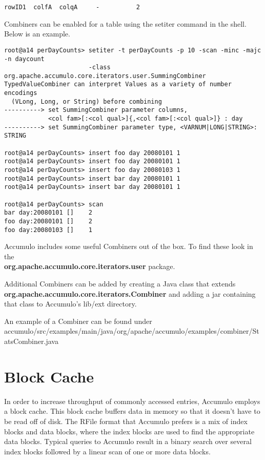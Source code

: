 \small
\begin{verbatim}
rowID1  colfA  colqA     -          2
\end{verbatim}
\normalsize

Combiners can be enabled for a table using the setiter command in the shell.  Below is an example.

\small
\begin{verbatim}
root@a14 perDayCounts> setiter -t perDayCounts -p 10 -scan -minc -majc -n daycount 
                       -class org.apache.accumulo.core.iterators.user.SummingCombiner
TypedValueCombiner can interpret Values as a variety of number encodings 
  (VLong, Long, or String) before combining
----------> set SummingCombiner parameter columns, 
            <col fam>[:<col qual>]{,<col fam>[:<col qual>]} : day
----------> set SummingCombiner parameter type, <VARNUM|LONG|STRING>: STRING

root@a14 perDayCounts> insert foo day 20080101 1
root@a14 perDayCounts> insert foo day 20080101 1
root@a14 perDayCounts> insert foo day 20080103 1
root@a14 perDayCounts> insert bar day 20080101 1
root@a14 perDayCounts> insert bar day 20080101 1

root@a14 perDayCounts> scan
bar day:20080101 []    2
foo day:20080101 []    2
foo day:20080103 []    1
\end{verbatim}
\normalsize

Accumulo includes some useful Combiners out of the box.  To find these look in
the\\ \textbf{org.apache.accumulo.core.iterators.user} package.

Additional Combiners can be added by creating a Java class that extends\\
\textbf{org.apache.accumulo.core.iterators.Combiner} and adding a jar containing that
class to Accumulo's lib/ext directory.

An example of a Combiner can be found under\\
accumulo/src/examples/main/java/org/apache/accumulo/examples/combiner/StatsCombiner.java


\section{Block Cache}

In order to increase throughput of commonly accessed entries, Accumulo employs a block cache.
This block cache buffers data in memory so that it doesn't have to be read off of disk.
The RFile format that Accumulo prefers is a mix of index blocks and data blocks, where the index blocks are used to find the appropriate data blocks.
Typical queries to Accumulo result in a binary search over several index blocks followed by a linear scan of one or more data blocks.

